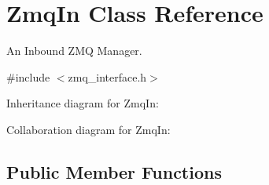 \hypertarget{classZmqIn}{}\section{Zmq\+In Class Reference}
\label{classZmqIn}


An Inbound Z\+MQ Manager.  




{\ttfamily \#include $<$zmq\+\_\+interface.\+h$>$}



Inheritance diagram for Zmq\+In\+:


Collaboration diagram for Zmq\+In\+:
\subsection*{Public Member Functions}
